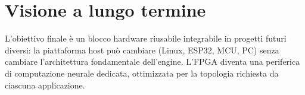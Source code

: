 \section{Visione a lungo termine}
L'obiettivo finale è un blocco hardware riusabile integrabile in progetti futuri
diversi: la piattaforma host può cambiare (Linux, ESP32, MCU, PC) senza cambiare
l'architettura fondamentale dell'engine. L'FPGA diventa una periferica di computazione
neurale dedicata, ottimizzata per la topologia richiesta da ciascuna applicazione.
